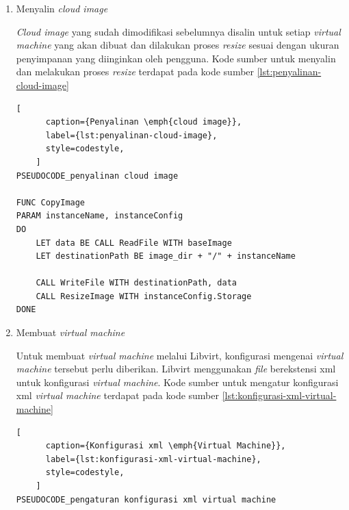 \begin{enumerate}
\begin{lstlisting}[
      caption={Pembuatan \emph{File} Konfigurasi Lanjutan \emph{Worker Node}},
      label={lst:pembuatan-file-konfigurasi-worker-node},
      style=codestyle,
    ]
FUNC CreateWorkerNodeCloudInit
DO
    LET configuration BE WorkerNodeConfiguration
    LET networkConfiguration BE CloudNetworkConfiguration
    
    CALL WriteFile WITH configuration
    CALL cloud-localds WITH configuration, networkConfiguration
DONE
    \end{lstlisting}

    Pada kode sumber \ref{lst:pembuatan-file-konfigurasi-control-plane}
    dan \ref{lst:pembuatan-file-konfigurasi-worker-node}, \emph{disk}
    dibuat menggunakan \emph{tool} \lstinline{cloud-localds}. \emph{Tool}
    tersebut menghasilkan \emph{file} berekstensi iso yang nantinya akan
    dipasangkan ke \emph{virtual machine}.

  \item Menyalin \emph{cloud image}

    \emph{Cloud image} yang sudah dimodifikasi sebelumnya disalin untuk
    setiap \emph{virtual machine} yang akan dibuat dan dilakukan proses
    \emph{resize} sesuai dengan ukuran penyimpanan yang diinginkan oleh
    pengguna. Kode sumber untuk menyalin dan melakukan proses \emph{resize}
    terdapat pada kode sumber \ref{lst:penyalinan-cloud-image}

    \clearpage

    \begin{lstlisting}[
      caption={Penyalinan \emph{cloud image}},
      label={lst:penyalinan-cloud-image},
      style=codestyle,
    ]
PSEUDOCODE_penyalinan cloud image

FUNC CopyImage
PARAM instanceName, instanceConfig
DO
    LET data BE CALL ReadFile WITH baseImage
    LET destinationPath BE image_dir + "/" + instanceName

    CALL WriteFile WITH destinationPath, data
    CALL ResizeImage WITH instanceConfig.Storage
DONE
    \end{lstlisting}

  \item Membuat \emph{virtual machine}

    Untuk membuat \emph{virtual machine} melalui Libvirt, konfigurasi
    mengenai \emph{virtual machine} tersebut perlu diberikan. Libvirt menggunakan
    \emph{file} berekstensi xml untuk konfigurasi \emph{virtual machine}.
    Kode sumber untuk mengatur konfigurasi xml \emph{virtual machine} terdapat
    pada kode sumber \ref{lst:konfigurasi-xml-virtual-machine}

    \begin{lstlisting}[
      caption={Konfigurasi xml \emph{Virtual Machine}},
      label={lst:konfigurasi-xml-virtual-machine},
      style=codestyle,
    ]
PSEUDOCODE_pengaturan konfigurasi xml virtual machine


\end{lstlisting}
\end{enumerate}
